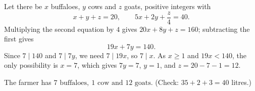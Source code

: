 Let there be $x$ buffaloes, $y$ cows and $z$ goats, positive integers with
\[x+y+z=20,\qquad5x+2y+\dfrac z4=40.\]
Multiplying the second equation by $4$ gives $20x+8y+z=160$; subtracting the first gives
\[19x+7y=140.\]
Since $7\mid140$ and $7\mid7y$, we need $7\mid19x$, so $7\mid x$. As $x\ge1$ and $19x<140$, the only possibility is $x=7$, which gives $7y=7$, $y=1$, and $z=20-7-1=12$.

The farmer has $\boxed{7\text{ buffaloes},\ 1\text{ cow and }12\text{ goats}}$. (Check: $35+2+3=40$ litres.)
